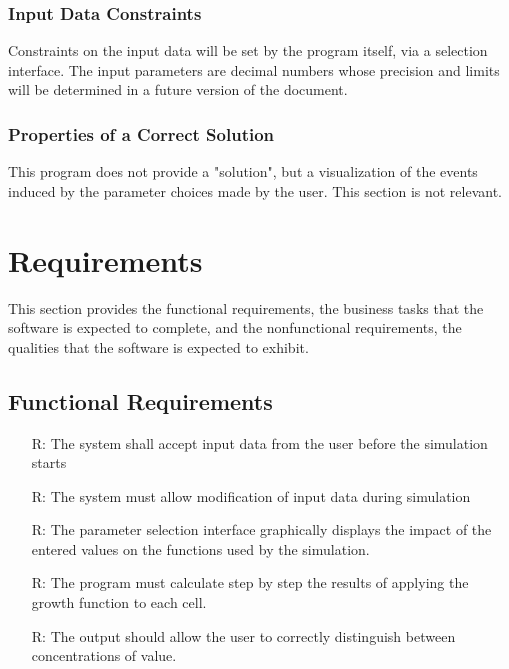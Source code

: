 \documentclass[12pt]{article}
\newcounter{reqnum} %
\begin{document}
\subsubsection{Input Data Constraints} \label{sec_DataConstraints}    

Constraints on the input data will be set by the program itself, via a selection interface. The input parameters are decimal numbers whose precision and limits will be determined in a future version of the document.


\subsubsection{Properties of a Correct Solution} \label{sec_CorrectSolution}

This program does not provide a "solution", but a visualization of the events induced by the parameter choices made by the user. This section is not relevant.

\section{Requirements}

This section provides the functional requirements, the business tasks that the
software is expected to complete, and the nonfunctional requirements, the
qualities that the software is expected to exhibit.

\subsection{Functional Requirements}

\noindent \begin{itemize}

\item[R\refstepcounter{reqnum}\thereqnum \label{R_Inputs}:] The system shall accept input data from the user before the simulation starts

\item[R\refstepcounter{reqnum}\thereqnum \label{R_Inputs}:] The system must allow modification of input data during simulation

\item[R\refstepcounter{reqnum}\thereqnum \label{R_Selection}:] The parameter selection interface graphically displays the impact of the entered values on the functions used by the simulation.

\item[R\refstepcounter{reqnum}\thereqnum \label{R_Calculate}:] The program must calculate step by step the results of applying the growth function to each cell.

\item[R\refstepcounter{reqnum}\thereqnum \label{R_Output}:] The output should allow the user to correctly distinguish between concentrations of value.

\end{itemize}
\end{document}
